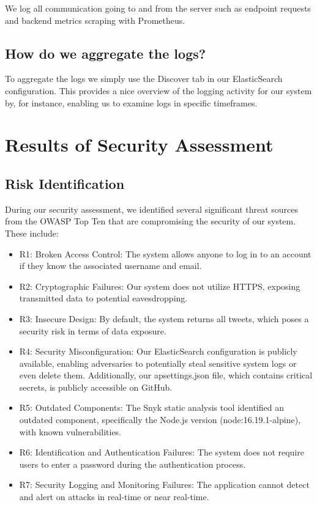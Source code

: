 We log all communication going to and from the server such as endpoint requests and backend metrics scraping with Prometheus.

\subsection{How do we aggregate the logs?}

To aggregate the logs we simply use the Discover tab in our ElasticSearch configuration. This provides a nice overview of the logging activity for our system by, for instance, enabling us to examine logs in specific timeframes.

\newpage

\section{Results of Security Assessment}

\subsection{Risk Identification}

During our security assessment, we identified several significant threat sources from the OWASP Top Ten \cite{owasp} that are compromising the security of our system. These include:

\begin{itemize}
\item R1: Broken Access Control: The system allows anyone to log in to an account if they know the associated username and email.
\item R2: Cryptographic Failures: Our system does not utilize HTTPS, exposing transmitted data to potential eavesdropping.
\item R3: Insecure Design: By default, the system returns all tweets, which poses a security risk in terms of data exposure.
\item R4: Security Misconfiguration: Our ElasticSearch configuration is publicly available, enabling adversaries to potentially steal sensitive system logs or even delete them. Additionally, our apsettings.json file, which contains critical secrets, is publicly accessible on GitHub.
\item R5: Outdated Components: The Snyk static analysis tool identified an outdated component, specifically the Node.js version (node:16.19.1-alpine), with known vulnerabilities.
\item R6: Identification and Authentication Failures: The system does not require users to enter a password during the authentication process.
\item R7: Security Logging and Monitoring Failures: The application cannot detect and alert on attacks in real-time or near real-time.
\end{itemize}

